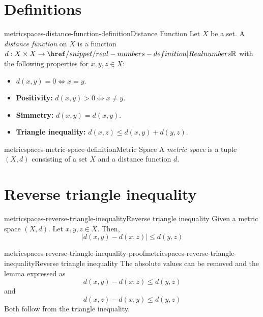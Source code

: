 \documentclass[preview]{standalone}
\begin{document}
\genpage

\section{Definitions}

\begin{snippetdefinition}{metricspaces-distance-function-definition}{Distance Function}
    Let \(X\) be a set.
    A \textit{distance function} on \(X\) is
    a function \(d: X \times X \to \realnumbers\)
    with the following properties for \(x,y,z \in X\):
    \begin{itemize}
        \item \(d(x,y) = 0 \iff x = y\).
        \item \textbf{Positivity:} \(d(x,y) > 0 \iff x \neq y\).
        \item \textbf{Simmetry:} \(d(x,y) = d(x,y)\).
        \item \textbf{Triangle inequality:} \(d(x,z) \leq d(x,y) + d(y,z)\).
    \end{itemize}
\end{snippetdefinition}

\begin{snippetdefinition}{metricspaces-metric-space-definition}{Metric Space}
    A \textit{metric space} is a tuple \((X, d)\)
    consisting of a set \(X\) and a distance function \(d\). %
\end{snippetdefinition}

\section{Reverse triangle inequality}

\begin{snippetlemma}{metricspaces-reverse-triangle-inequality}{Reverse triangle inequality}
    Given a metric space \((X,d)\). Let \(x,y,z \in X\).
    Then, \[|d(x,y) - d(x,z)| \leq d(y,z)\]
\end{snippetlemma}

\begin{snippetproof}{metricspaces-reverse-triangle-inequality-proof}{metricspaces-reverse-triangle-inequality}{Reverse triangle inequality}
    The absolute values can be removed and the lemma expressed as
    \[
        d(x,y) - d(x,z) \leq d(y,z)
    \]
    and
    \[
        d(x,z) - d(x,y) \leq d(y,z)
    \]
    Both follow from the triangle inequality.
\end{snippetproof}
\end{document}
